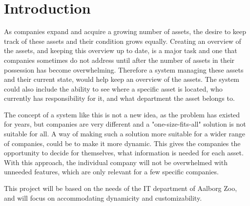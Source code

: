 \chapter{Introduction}\label{ch:introduction}
As companies expand and acquire a growing number of assets, the desire to keep track of these assets and their condition grows equally. Creating an overview of the assets, and keeping this overview up to date, is a major task and one that companies sometimes do not address until after the number of assets in their possession has become overwhelming. Therefore a system managing these assets and their current state, would help keep an overview of the assets. The system could also include the ability to see where a specific asset is located, who currently has responsibility for it, and what department the asset belongs to.
\par
The concept of a system like this is not a new idea, as the problem has existed for years, but companies are very different and a "one-size-fits-all" solution is not suitable for all. A way of making such a solution more suitable for a wider range of companies, could be to make it more dynamic. This gives the companies the opportunity to decide for themselves, what information is needed for each asset. With this approach, the individual company will not be overwhelmed with unneeded features, which are only relevant for a few specific companies.
\par
This project will be based on the needs of the IT department of Aalborg Zoo, and will focus on accommodating dynamicity and customizability.